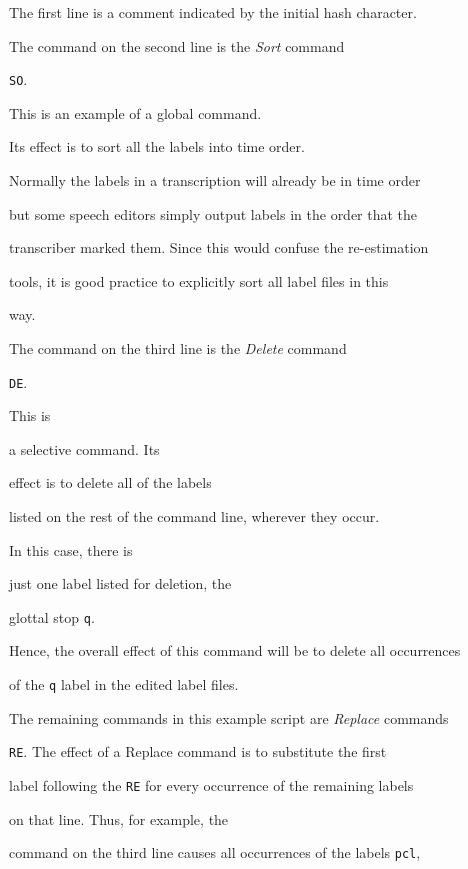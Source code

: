The first line is a comment indicated by the initial hash character.


The command on the second line is the {\it Sort} command 


\texttt{SO}.


This is an example of a global command.


Its effect is to sort all the labels into time order.


Normally the labels in a transcription will already be in time order


but some speech editors simply output labels in the order that the


transcriber marked them.  Since this would confuse the re-estimation


tools, it is good practice to explicitly sort all label files in this


way.





The command on the third line is the {\it Delete} command 


\texttt{DE}.  


This is


a selective command.  Its


effect is to delete all of the labels


listed on the rest of the command line, wherever they occur.


In this case, there is


just one label listed for deletion, the


glottal stop  \texttt{q}.


Hence, the overall effect of this command will be to delete all occurrences


of the \texttt{q} label in the edited label files.





The remaining commands in this example script are {\it Replace} commands


\texttt{RE}.  The effect of a Replace command is to substitute the first


label following the \texttt{RE} for every occurrence of the remaining labels


on that line.  Thus, for example, the 


command on the third line causes all occurrences of the labels \texttt{pcl},


